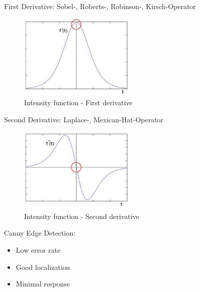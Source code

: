 \documentclass{beamer}
\begin{document}
\begin{frame}
	\begin{block}{First Derivative:}
		Sobel-, Roberts-, Robinson-, Kirsch-Operator 
	\end{block}
	\begin{figure} 
		\includegraphics[width=0.49\textwidth]{edge4.jpg}
		\caption{Intensity function - First derivative} 
	\end{figure}
\end{frame}

\begin{frame}
	\begin{block}{Second Derivative:}
	Laplace-, Mexican-Hat-Operator 
	\end{block}
	\begin{figure} 
		\includegraphics[width=0.49\textwidth]{edge5.jpg}
		\caption{Intensity function - Second derivative} 
	\end{figure}
\end{frame}

\begin{frame}
	\begin{block}{Canny Edge Detection:}
		\begin{itemize}
			\item Low error rate
			\item Good localization
			\item Minimal response
		\end{itemize}
	\end{block}
\end{frame}
\end{document}
